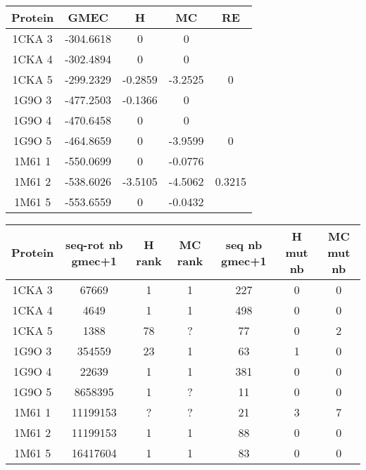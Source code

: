 \documentclass[a4paper,12pt]{article}
\begin{document}
    \begin{table}[h]
      \centering

      \begin{tabular}{|c|c|c|c|c|}


        \hline
        Protein & GMEC & H & MC & RE \\
        \hline
        1CKA 3 & -304.6618 & 0 & 0 & \\
        1CKA 4 & -302.4894 & 0 & 0 & \\
        1CKA 5 & -299.2329 & -0.2859 & -3.2525 & 0 \\
        1G9O 3 & -477.2503 & -0.1366 & 0 & \\
        1G9O 4 & -470.6458 & 0 & 0 & \\
        1G9O 5 & -464.8659 & 0 & -3.9599 &  0 \\
        1M61 1 & -550.0699 & 0 & -0.0776 & \\
        1M61 2 & -538.6026 & -3.5105 & -4.5062 & 0.3215 \\
        1M61 5 & -553.6559 & 0 & -0.0432 & \\
        
        \hline


 \end{tabular}      
 \label{tab_1}      
\end{table}


    \begin{table}[h]
      \centering

      \begin{tabular}{|c|c|c|c|c|c|c|}


        \hline
        Protein & seq-rot nb gmec+1 & H rank  & MC rank  & seq nb gmec+1 & H mut nb & MC mut nb \\
        \hline
        1CKA 3 & 67669 & 1 & 1 & 227 & 0 & 0 \\
        1CKA 4 & 4649 & 1 & 1 & 498 & 0 & 0 \\
        1CKA 5 & 1388 & 78 & ? & 77 & 0 & 2 \\
        1G9O 3 & 354559 & 23 & 1 & 63 & 1 & 0 \\
        1G9O 4 & 22639 & 1 & 1 & 381 & 0 & 0 \\
        1G9O 5 & 8658395 & 1 & ? &  11 & 0 & 0 \\
        1M61 1 & 11199153 & ? & ? & 21 & 3 & 7 \\
        1M61 2 & 11199153 & 1 & 1 & 88 & 0 & 0 \\
        1M61 5 & 16417604 & 1 & 1 & 83 & 0 & 0 \\
        
        \hline


 \end{tabular}      
 \label{tab_2}      
\end{table}
\end{document}
